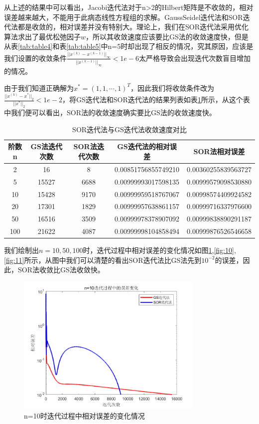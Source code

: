 \documentclass[a4paper]{article}
\begin{document}
从上述的结果中可以看出，Jacobi迭代法对于n>2的Hilbert矩阵是不收敛的，相对误差越来越大，不能用于此病态线性方程组的求解。GaussSeidel迭代法和SOR迭代法都是收敛的，相对误差并没有特别大。理论上，我们在SOR迭代法采用优化算法求出了最优松弛因子$w$，所以其收敛速度应该要比GS法的收敛速度快，但是从表\ref{tab:table4}和表\ref{tab:table5}中n=5时却出现了相反的情况，究其原因，应该是我们设置的收敛条件$\frac{||x^{(k)}-x^{(k-1)}||_\infty}{||x^{(k-1)}||_\infty}<1e-6$太严格导致会出现迭代次数盲目增加的情况。

由于我们知道正确解为$x^*=(1,1,\cdots,1)^T$，因此我们将收敛条件改为$\frac{||x^{(k)}-x^*||_2}{||x^{*}||_2}<1e-2$，将GS迭代法和SOR迭代法的结果列表如表\ref{tab:table6}所示，从这个表中我们便可以看出，SOR法的收敛速度确实要比GS法的收敛速度快。

\begin{table}[htbp]
	\centering
	\caption{SOR迭代法与GS迭代法收敛速度对比}
	\label{tab:table6}
	\begin{tabular}{|c|c|c|c|c|}
		\hline
		阶数n & GS法迭代次数& SOR法迭代次数 &GS迭代法的相对误差 & SOR法相对误差\\
		\hline
		2 & 16& 8& 0.00851756855749210& 0.00360255839563727\\
		\hline
		5 & 15527& 6688& 0.00999993017598135& 0.00999579098530880\\
		\hline
		10 & 15428& 9170& 0.00999959518767067& 0.00998574409924582\\
		\hline
		20 & 17301& 1829& 0.00999957638861157& 0.00999716337976600\\
		\hline
		50 & 16516& 3509& 0.00999978378907092& 0.00999838890291187\\
		\hline
		100 & 21622 & 4087& 0.00999998104858494& 0.00999876526546658\\
		\hline
	\end{tabular}
\end{table}

我们绘制出$n=10,50,100$时，迭代过程中相对误差的变化情况如图\ref{fig:9},\ref{fig:10},\ref{fig:11}所示，从图中我们可以清楚的看出SOR迭代法比GS法先到$10^{-2}$的误差，因此，SOR法收敛比GS法收敛快。

\begin{figure}[!h]
	\centering
	\includegraphics[width=0.8\textwidth]{../code/result/er10}
	\caption{\label{fig:9}n=10时迭代过程中相对误差的变化情况}
\end{figure}
\end{document}

